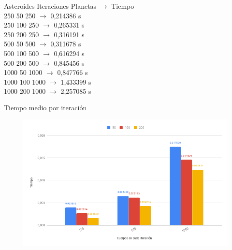 \documentclass[12pt]{article}
\begin{document}
\begin{enumerate}[label=(\Alph*)]
                \begin{center}
                    \noindent Asteroides Iteraciones Planetas $\rightarrow$ Tiempo \\
                    250 50 250 $\rightarrow$ 0,214386 s \\
                    250 100 250 $\rightarrow$ 0,265331 s \\
                    250 200 250 $\rightarrow$ 0,316191 s \\
                    500 50 500 $\rightarrow$ 0,311678 s \\
                    500 100 500 $\rightarrow$ 0,616294 s \\
                    500 200 500 $\rightarrow$ 0,845456 s \\
                    1000 50 1000 $\rightarrow$ 0,847766 s \\
                    1000 100 1000 $\rightarrow$ 1,433399 s \\
                    1000 200 1000 $\rightarrow$ 2,257085 s \\
                \end{center}
                
                \newpage
                \begin{center}
                    Tiempo medio por iteración
                \end{center}
                \begin{figure}[hbt!]
                    \centering
                    \includegraphics[width=\linewidth]{images/chart6.png}
                \end{figure}
                

\end{enumerate}
\end{document}
